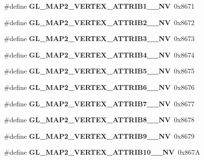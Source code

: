 \begin{DoxyCompactItemize}
\item 
\#define {\bfseries G\+L\+\_\+\+M\+A\+P2\+\_\+\+V\+E\+R\+T\+E\+X\+\_\+\+A\+T\+T\+R\+I\+B1\+\_\+\_\+\+N\+V}~0x8671\label{_s_d_l__opengl_8h_abba3d2e80643ab245bdca062223689af}

\item 
\#define {\bfseries G\+L\+\_\+\+M\+A\+P2\+\_\+\+V\+E\+R\+T\+E\+X\+\_\+\+A\+T\+T\+R\+I\+B2\+\_\+\_\+\+N\+V}~0x8672\label{_s_d_l__opengl_8h_a4e3e47130fa8c1b06437bfc6dfc66fc3}

\item 
\#define {\bfseries G\+L\+\_\+\+M\+A\+P2\+\_\+\+V\+E\+R\+T\+E\+X\+\_\+\+A\+T\+T\+R\+I\+B3\+\_\+\_\+\+N\+V}~0x8673\label{_s_d_l__opengl_8h_ab7e677149731afde7fe29999abd28e88}

\item 
\#define {\bfseries G\+L\+\_\+\+M\+A\+P2\+\_\+\+V\+E\+R\+T\+E\+X\+\_\+\+A\+T\+T\+R\+I\+B4\+\_\+\_\+\+N\+V}~0x8674\label{_s_d_l__opengl_8h_ab63fbd2dc7d6c60e3fc78c2fb0c66e98}

\item 
\#define {\bfseries G\+L\+\_\+\+M\+A\+P2\+\_\+\+V\+E\+R\+T\+E\+X\+\_\+\+A\+T\+T\+R\+I\+B5\+\_\+\_\+\+N\+V}~0x8675\label{_s_d_l__opengl_8h_ac493cec6642a7193e883504f6033b286}

\item 
\#define {\bfseries G\+L\+\_\+\+M\+A\+P2\+\_\+\+V\+E\+R\+T\+E\+X\+\_\+\+A\+T\+T\+R\+I\+B6\+\_\+\_\+\+N\+V}~0x8676\label{_s_d_l__opengl_8h_a120155996331fb6e5db67b61e64a5e35}

\item 
\#define {\bfseries G\+L\+\_\+\+M\+A\+P2\+\_\+\+V\+E\+R\+T\+E\+X\+\_\+\+A\+T\+T\+R\+I\+B7\+\_\+\_\+\+N\+V}~0x8677\label{_s_d_l__opengl_8h_ae65522a4f40973bff20aee5d4c17abcd}

\item 
\#define {\bfseries G\+L\+\_\+\+M\+A\+P2\+\_\+\+V\+E\+R\+T\+E\+X\+\_\+\+A\+T\+T\+R\+I\+B8\+\_\+\_\+\+N\+V}~0x8678\label{_s_d_l__opengl_8h_a750015713b5caecb22a3a63e41ee9498}

\item 
\#define {\bfseries G\+L\+\_\+\+M\+A\+P2\+\_\+\+V\+E\+R\+T\+E\+X\+\_\+\+A\+T\+T\+R\+I\+B9\+\_\+\_\+\+N\+V}~0x8679\label{_s_d_l__opengl_8h_a94df31200946f64b8d912a9b936da598}

\item 
\#define {\bfseries G\+L\+\_\+\+M\+A\+P2\+\_\+\+V\+E\+R\+T\+E\+X\+\_\+\+A\+T\+T\+R\+I\+B10\+\_\+\_\+\+N\+V}~0x867\+A\label{_s_d_l__opengl_8h_a23326bbaec470f3a1acc2d05f52ed8cd}


\end{DoxyCompactItemize}
